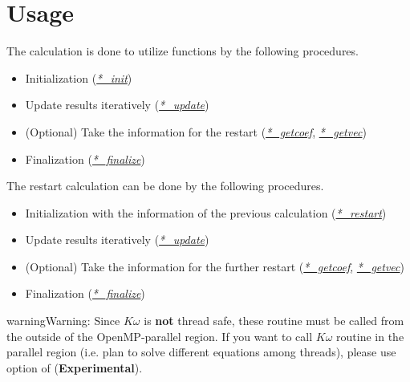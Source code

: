 \documentclass[letterpaper,10pt,dvipdfmx,openany]{sphinxmanual}
\begin{document}
\chapter{Usage}
\label{komega_usage_en:usage}\label{komega_usage_en::doc}
The calculation is done to utilize functions by the following
procedures.
\begin{itemize}
\item {} 
Initialization ({\hyperref[komega_usage_en:init]{\emph{*\_init}}})

\item {} 
Update results iteratively ({\hyperref[komega_usage_en:update]{\emph{*\_update}}})

\item {} 
(Optional) Take the information for the restart ({\hyperref[komega_usage_en:getcoef]{\emph{*\_getcoef}}}, {\hyperref[komega_usage_en:getvec]{\emph{*\_getvec}}})

\item {} 
Finalization ({\hyperref[komega_usage_en:finalize]{\emph{*\_finalize}}})

\end{itemize}

The restart calculation can be done by the following procedures.
\begin{itemize}
\item {} 
Initialization with the information of the previous calculation ({\hyperref[komega_usage_en:restart]{\emph{*\_restart}}})

\item {} 
Update results iteratively ({\hyperref[komega_usage_en:update]{\emph{*\_update}}})

\item {} 
(Optional) Take the information for the further restart ({\hyperref[komega_usage_en:getcoef]{\emph{*\_getcoef}}}, {\hyperref[komega_usage_en:getvec]{\emph{*\_getvec}}})

\item {} 
Finalization ({\hyperref[komega_usage_en:finalize]{\emph{*\_finalize}}})

\end{itemize}

\begin{notice}{warning}{Warning:}
Since \(K\omega\) is \textbf{not} thread safe,
these routine must be called from the outside of the OpenMP-parallel region.
If you want to call \(K\omega\) routine in the parallel region
(i.e. plan to solve different equations among threads),
please use  option of 
(\textbf{Experimental}).
\end{notice}
\end{document}
